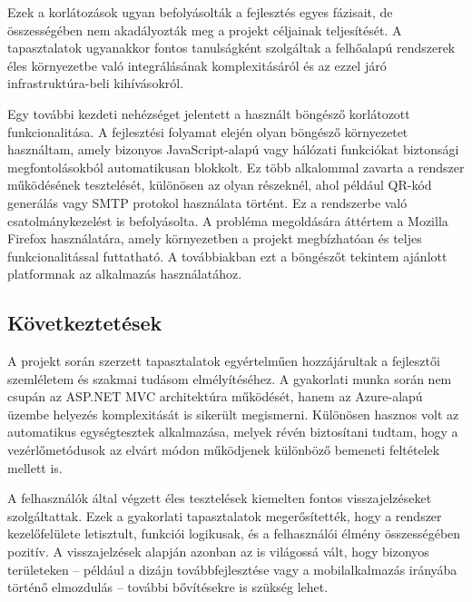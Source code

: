 Ezek a korlátozások ugyan befolyásolták a fejlesztés egyes fázisait, de összességében nem akadályozták meg a projekt céljainak teljesítését. A tapasztalatok ugyanakkor fontos tanulságként szolgáltak a felhőalapú rendszerek éles környezetbe való integrálásának komplexitásáról és az ezzel járó infrastruktúra-beli kihívásokról.

Egy további kezdeti nehézséget jelentett a használt böngésző korlátozott funkcionalitása. A fejlesztési folyamat elején olyan böngésző környezetet használtam, amely bizonyos JavaScript-alapú vagy hálózati funkciókat biztonsági megfontolásokból automatikusan blokkolt. Ez több alkalommal zavarta a rendszer működésének tesztelését, különösen az olyan részeknél, ahol például QR-kód generálás vagy SMTP protokol használata történt. Ez a rendszerbe való csatolmánykezelést is befolyásolta. A probléma megoldására áttértem a Mozilla Firefox használatára, amely környezetben a projekt megbízhatóan és teljes funkcionalitással futtatható. A továbbiakban ezt a böngészőt tekintem ajánlott platformnak az alkalmazás használatához.


\subsection{Következtetések}

A projekt során szerzett tapasztalatok egyértelműen hozzájárultak a fejlesztői szemléletem és szakmai tudásom elmélyítéséhez. A gyakorlati munka során nem csupán az ASP.NET MVC architektúra működését, hanem az Azure-alapú üzembe helyezés komplexitását is sikerült megismerni. Különösen hasznos volt az automatikus egységtesztek alkalmazása, melyek révén biztosítani tudtam, hogy a vezérlőmetódusok az elvárt módon működjenek különböző bemeneti feltételek mellett is.

A felhasználók által végzett éles tesztelések kiemelten fontos visszajelzéseket szolgáltattak. Ezek a gyakorlati tapasztalatok megerősítették, hogy a rendszer kezelőfelülete letisztult, funkciói logikusak, és a felhasználói élmény összességében pozitív. A visszajelzések alapján azonban az is világossá vált, hogy bizonyos területeken – például a dizájn továbbfejlesztése vagy a mobilalkalmazás irányába történő elmozdulás – további bővítésekre is szükség lehet.

